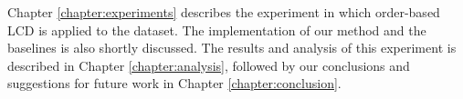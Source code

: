 Chapter \ref{chapter:experiments} describes the experiment in which order-based LCD is applied to the \citet{kemmeren2014large} dataset. The implementation of our method and the baselines is also shortly discussed. The results and analysis of this experiment is described in Chapter \ref{chapter:analysis}, followed by our conclusions and suggestions for future work in Chapter \ref{chapter:conclusion}.




